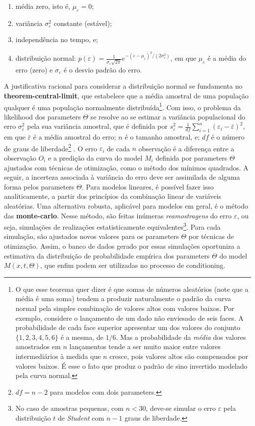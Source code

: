 \documentclass[./main.tex]{subfiles}
\begin{document}
\begin{enumerate}
    \item média zero, isto é, $\mu_{\varepsilon} = 0$;
    \item variância $\sigma_{\varepsilon}^2$ constante (estável);
    \item independência no tempo, e;
    \item distribuição normal: $p(\varepsilon) = \frac{1}{\sigma_{\varepsilon} \sqrt{2\pi}}e^{-(\varepsilon-\mu_{\varepsilon})^2/{(2\sigma_{\varepsilon}^2)}}$, em que $\mu_{\varepsilon}$ é a média do erro (zero) e $\sigma_{\varepsilon}$ é o desvio padrão do erro.
\end{enumerate}
A justificativa racional para considerar a distribuição normal se fundamenta no \textbf{\gls{theorem-central-limit}}, que estabelece que a média amostral de uma população qualquer é uma população normalmente distribuída\footnote{O que esse teorema quer dizer é que somas de números aleatórios (note que a média é uma soma) tendem a produzir naturalmente o padrão da curva normal pela simples combinação de valores altos com valores baixos. Por exemplo, considere o lançamento de um dado não enviesado de seis faces. A probabilidade de cada face superior apresentar um dos valores do conjunto $\{1, 2, 3, 4, 5, 6\}$ é a mesma, de $1/6$. Mas a probabilidade da \textit{média} dos valores amostrados em $n$ lançamentos tende a ser muito maior entre valores intermediários à medida que $n$ cresce, pois valores altos são compensados por valores baixos. É esse o fato que produz o padrão de sino invertido modelado pela curva normal.}. Com isso, o problema da \gls{likelihood} dos \gls{parameters} $\Theta$ se resolve ao se estimar a variância populacional do erro $\sigma^2_\varepsilon$ pela sua variância amostral, que é definida por $s^2_{\varepsilon} = \frac{1}{df}\sum_{i=1}^{n}({\varepsilon_i - \bar{\varepsilon}})^2$, em que $\bar{\varepsilon}$ é a média amostral do erro; $n$ é o tamanho amostral, e; $df$ é o número de graus de liberdade\footnote{$df = n-2$ para modelos com dois \gls{parameters}.} \cite{graybill1994}. O erro $\varepsilon_i$ de cada $n$ observação é a diferença entre a observação $O_i$ e a predição da curva do \gls{model} $M_i$ definida por \gls{parameters} $\Theta$ ajustados com técnicas de otimização, como o método dos mínimos quadrados. A seguir, a incerteza associada à variância do erro deve ser assimilada de alguma forma pelos \gls{parameters} $\Theta$. Para modelos lineares, é possível fazer isso analiticamente, a partir dos princípios da combinação linear de variáveis aleatórias. Uma alternativa robusta, aplicável para modelos em geral, é o método das \textbf{\gls{monte-carlo}}. Nesse método, são feitas inúmeras \textit{reamostragens} do erro $\varepsilon$, ou seja, simulações de realizações estatisticamente equivalentes\footnote{No caso de amostras pequenas, com $n < 30$, deve-se simular o erro $\varepsilon$ pela distribuição $t$ de \textit{Student} com $n-1$ graus de liberdade.}. Para cada simulação, são ajustados novos valores para os \gls{parameters} $\Theta$ por técnicas de otimização. Assim, o banco de dados gerado por essas simulações oportuniza a estimativa da distribuição de probabilidade empírica dos \gls{parameters} $\Theta$ do \gls{model} $M(x, t, \Theta)$, que enfim podem ser utilizadas no processo de \gls{conditioning}. 
\end{document}
